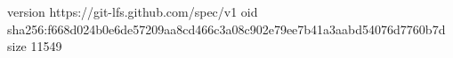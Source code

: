 version https://git-lfs.github.com/spec/v1
oid sha256:f668d024b0e6de57209aa8cd466c3a08c902e79ee7b41a3aabd54076d7760b7d
size 11549
